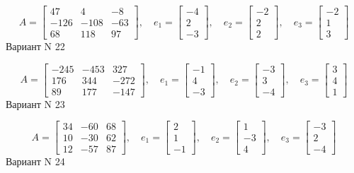 \documentclass[11pt]{report}
\begin{document}
$$A = \left[\begin{matrix}47 & 4 & -8\\-126 & -108 & -63\\68 & 118 & 97\end{matrix}\right],\quad e_1 = \left[\begin{matrix}-4\\2\\-3\end{matrix}\right],\quad e_2 = \left[\begin{matrix}-2\\2\\2\end{matrix}\right],\quad e_3 = \left[\begin{matrix}-2\\1\\3\end{matrix}\right]$$Вариант N 22

$$A = \left[\begin{matrix}-245 & -453 & 327\\176 & 344 & -272\\89 & 177 & -147\end{matrix}\right],\quad e_1 = \left[\begin{matrix}-1\\4\\-3\end{matrix}\right],\quad e_2 = \left[\begin{matrix}-3\\3\\-4\end{matrix}\right],\quad e_3 = \left[\begin{matrix}3\\4\\1\end{matrix}\right]$$Вариант N 23

$$A = \left[\begin{matrix}34 & -60 & 68\\10 & -30 & 62\\12 & -57 & 87\end{matrix}\right],\quad e_1 = \left[\begin{matrix}2\\1\\-1\end{matrix}\right],\quad e_2 = \left[\begin{matrix}1\\-3\\4\end{matrix}\right],\quad e_3 = \left[\begin{matrix}-3\\2\\-4\end{matrix}\right]$$Вариант N 24
\end{document}
